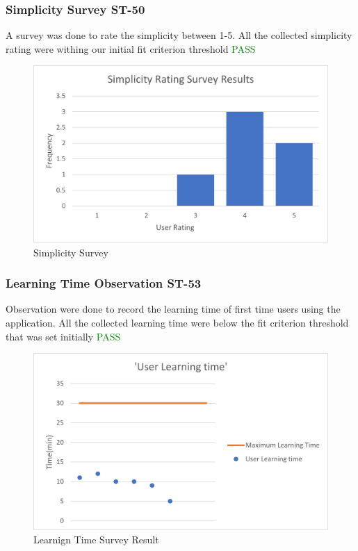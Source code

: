 \documentclass[12pt, titlepage]{article}
\begin{document}
	\subsubsection{Simplicity Survey ST-50}
	A survey was done to rate the simplicity between 1-5. All the collected simplicity rating were withing our initial fit criterion threshold \textcolor{green}{PASS}
	\begin{figure}[H]
		\centering
		\includegraphics[]{simplicitysurvey}
		\caption{Simplicity Survey}
	\end{figure}
	
	\subsubsection{Learning Time Observation ST-53}
	Observation were done to record the learning time of first time users using the application. All the collected learning time were below the fit criterion threshold that was set initially \textcolor{green}{PASS}
	\begin{figure}[H]
		\centering
		\includegraphics[]{learningtime}
		\caption{Learnign Time Survey Result}
	\end{figure}
	
\end{document}
